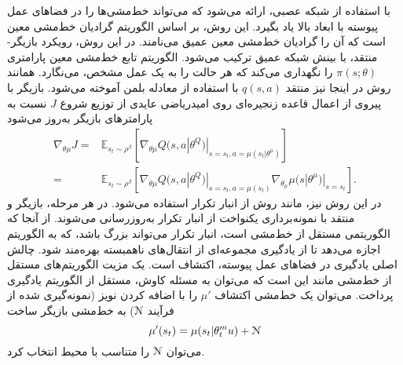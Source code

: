 با استفاده از شبکه عصبی، ارائه می‌شود که می‌تواند خط‌مشی‌ها را در فضاهای عمل پیوسته با ابعاد بالا یاد بگیرد.
این روش، بر اساس الگوریتم گرادیان خط‌مشی معین
است که آن را گرادیان خط‌مشی معین عمیق
می‌نامند. 
در این روش، رویکرد بازیگر-منتقد، با بینش شبکه  عمیق
ترکیب می‌شود.
الگوریتم 
تابع خط‌مشی معین پارامتری
$
\pi(s;\theta)	
$
را نگهداری می‌کند که هر حالت را به یک عمل مشخص، می‌نگارد.
همانند روش 
در اینجا نیز منتقد
$q(s,a)$
با استفاده از معادله بلمن آموخته می‌شود.
بازیگر با پیروی از اعمال قاعده زنجیره‌ای روی امیدریاضی عایدی از توزیع شروع
$J$
نسبت به پارامترهای بازیگر به‌روز می‌شود
\begin{align}
	\nabla_{\theta \mu} J = & \mathbb{E}_{s_t \sim \rho ^{ \beta}} \left[ \nabla_{\theta \mu} Q(s,a|\theta^Q)|_{s=s_t,a=\mu (s_t|\theta^{\mu})}  \right] \\ \nonumber
	= & \mathbb{E}_{s_t \sim \rho ^{ \beta}} [ \nabla_{\theta \mu} Q(s,a|\theta^Q)|_{s=s_t, a=\mu (s_t)} \nabla_{\theta_{\mu}} \mu (s|\theta^{\mu})|_{s=s_t} ].
\end{align}
در این روش نیز، مانند روش 
از انبار تکرار استفاده می‌شود. 
در هر مرحله، بازیگر و منتقد با نمونه‌برداری یکنواخت از انبار تکرار به‌روزرسانی می‌شوند. از آنجا که 
الگوریتمی مستقل از خط‌مشی است، انبار تکرار می‌تواند بزرگ باشد، که به الگوریتم اجازه می‌دهد تا از یادگیری مجموعه‌ای از انتقال‌های ناهمبسته بهره‌مند شود.
چالش اصلی یادگیری در فضاهای عمل پیوسته، اکتشاف است. یک مزیت  الگوریتم‌های مستقل از خط‌مشی مانند 
این است که می‌توان به مسئله کاوش، مستقل از الگوریتم یادگیری پرداخت.
می‌توان یک خط‌مشی اکتشاف 
$\mu'$
را با اضافه کردن نویز (نمونه‌گیری شده از فرآیند $\EuScript{N}$) به خط‌مشی بازیگر ساخت
\begin{equation}
\mu'(s_t) = \mu(s_t|\theta_t^mu) + \EuScript{N}
\end{equation}
می‌توان $\EuScript{N}$ 
را متناسب با محیط انتخاب کرد.
